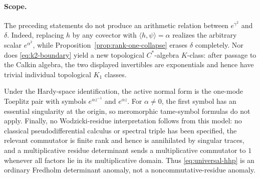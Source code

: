 \paragraph{Scope.}
The preceding statements do not produce an arithmetic relation between
$e^{\gamma^2}$ and $\delta$.  Indeed, replacing $h$ by any covector with
$\langle h,\psi\rangle=\alpha$ realizes the arbitrary scalar
$e^{\alpha^2}$, while Proposition~\ref{prop:rank-one-collapse} erases
$\delta$ completely.  Nor does \eqref{eq:k2-boundary} yield a new
topological $C^*$-algebra $K$-class: after passage to the Calkin algebra,
the two displayed invertibles are exponentials and hence have trivial
individual topological $K_1$ classes.

Under the Hardy-space identification, the active normal form is the
one-mode Toeplitz pair with symbols $e^{\alpha z^{-1}}$ and $e^{\alpha z}$.
For $\alpha\ne0$, the first symbol has an essential singularity at the
origin, so meromorphic tame-symbol formulas do not apply.  Finally, no
Wodzicki-residue interpretation follows from this model: no classical
pseudodifferential calculus or spectral triple has been specified, the
relevant commutator is finite rank and hence is annihilated by singular
traces, and a multiplicative residue determinant sends a multiplicative
commutator to $1$ whenever all factors lie in its multiplicative domain.
Thus \eqref{eq:universal-hhp} is an ordinary Fredholm
determinant anomaly, not a noncommutative-residue anomaly.
